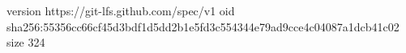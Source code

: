 version https://git-lfs.github.com/spec/v1
oid sha256:55356cc66cf45d3bdf1d5dd2b1e5fd3c554344e79ad9cce4c04087a1dcb41c02
size 324
